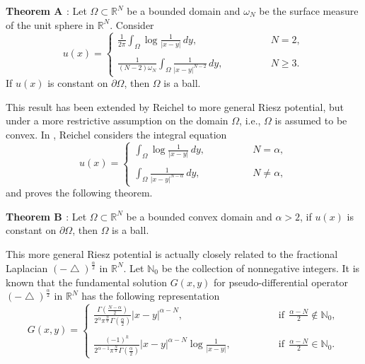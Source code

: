 \documentclass[12pt]{amsproc}
\theoremstyle{plain}
\numberwithin{equation}{section}
\begin{document}
{\bf Theorem A \cite{Fr}}: Let $\Omega\subset \mathbb R^N$ be a
bounded domain and $\omega_N$ be the surface measure of the unit
sphere in $\mathbb R^N$. Consider
\begin{equation}
u(x)=\left \{ \begin{array}{lll} \frac{1}{2 \pi} \int_\Omega \log{\frac{1}{|x-y|}} \,dy, \qquad \qquad  & N=2,\\
\\
\frac{1}{(N-2)\omega_N} \int_\Omega \frac{1}{|x-y|^{N-2}} \,dy,
\qquad \qquad & N\geq 3.
\end{array} \right.
\label{Fr}
\end{equation}
If $u(x)$ is constant on $\partial \Omega$, then $\Omega$ is a ball.

This result has been extended by Reichel \cite{R2} to more general
Riesz potential, but under a more restrictive assumption on the
domain $\Omega$, i.e., $\Omega$ is assumed to be convex. In
\cite{R2},  Reichel considers the integral equation
\begin{equation}
u(x)=\left \{ \begin{array}{lll} \int_\Omega \log{\frac{1}{|x-y|}} \,dy, \qquad \qquad  & N=\alpha,\\
\\
\int_\Omega \frac{1}{|x-y|^{N-\alpha}} \,dy, \qquad \qquad & N\neq
\alpha,
\end{array} \right.
\label{int}
\end{equation}
and proves the following theorem.

{\bf Theorem B \cite{R2} }: Let $\Omega\subset \mathbb R^N$ be a
bounded convex domain and $\alpha >2$, if $u(x)$ is constant on
$\partial \Omega$, then $\Omega$ is a ball.

This more general Riesz potential is actually closely related to the
fractional Laplacian $(-{\mbox{$\bigtriangleup$}})^{\frac{\alpha}{2}}$ in $\mathbb R^N$.
Let $\mathbb{N}_0$ be the collection of nonnegative integers. It is
known that the fundamental solution $G(x,y)$ for pseudo-differential
operator $(-{\mbox{$\bigtriangleup$}})^{\frac{\alpha}{2}}$ in $\mathbb R^N$ has the
following representation
\begin{equation}
G(x,y)=\left\{
\begin{array}{ll}
\frac{\Gamma(\frac{N-\alpha}{2})}{2^\alpha \pi^{\frac{N}{2}}
\Gamma(\frac{\alpha}{2})}|x-y|^{\alpha-N},  \qquad \qquad
&\mbox{if}\ \ \frac{\alpha-N}{2}\not\in \mathbb{N}_0,\\
\\
\frac{(-1)^k}{2^{\alpha-1}\pi^{\frac{N}{2}}\Gamma({\frac{\alpha}{2}})}|x-y|^{\alpha-N}\log\frac{1}{|x-y|},
\qquad \qquad &\mbox{if}\ \ \frac{\alpha-N}{2}\in \mathbb{N}_0.
\end{array} \right.
\label{green}
\end{equation}
\end{document}
